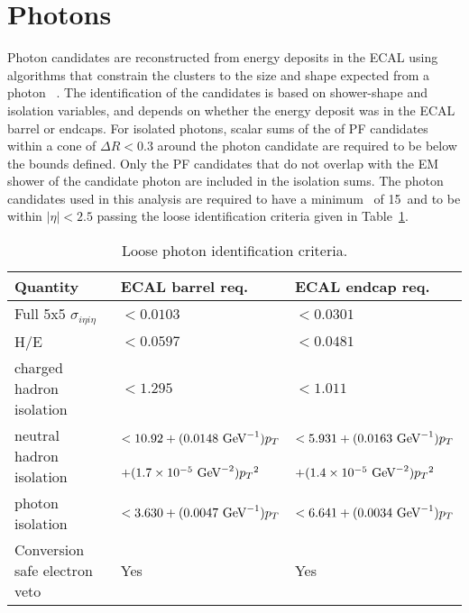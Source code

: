 \section{Photons}
Photon candidates are reconstructed from energy deposits in the ECAL using algorithms
that constrain the clusters to the size and shape expected from a photon~\cite{CMS:EGM-14-001} .
The identification of the candidates is based on shower-shape and isolation variables, and depends on
whether the energy deposit was in the ECAL barrel or endcaps.
For isolated photons, scalar sums of the \pt of PF candidates within a cone of $\Delta R < 0.3$
around the photon candidate are required to be below the bounds defined. Only the PF candidates
that do not overlap with the EM shower of the candidate photon are included in the isolation sums.
The photon candidates used in this analysis are required to have a minimum \pt~of 15~\GeV and to  
be within $|\eta| < 2.5$ passing the loose identification criteria given in Table~\ref{tab:PhotonIDLoose}.

\begin{table}[htbp]
  \begin{center}
 {\footnotesize
  \begin{tabular} {lll}
\hline
Quantity                                   &  ECAL barrel req. & ECAL endcap req.  \\
\hline
Full 5x5 $\sigma_{i\eta i\eta}$            & $< 0.0103$ & $< 0.0301$     \\ \hline 
H/E                                        & $< 0.0597$ & $< 0.0481$     \\ \hline 
charged hadron isolation                   & $< 1.295$  & $< 1.011$      \\ \hline 
\multirow{2}{*}{neutral hadron isolation}  & $< 10.92 + (0.0148\,{\,\text{Ge\hspace{-.08em}V}}^{-1})p_T$          & $< 5.931 + (0.0163\,{\,\text{Ge\hspace{-.08em}V}}^{-1})p_T$        \\  
                                           & $+ (1.7\times 10^{-5}\,{\,\text{Ge\hspace{-.08em}V}}^{-2}){p_T}^2$   & $+(1.4\times 10^{-5}\,{\,\text{Ge\hspace{-.08em}V}}^{-2}){p_T}^2$  \\ \hline
photon isolation                           & $< 3.630 + (0.0047\,{\,\text{Ge\hspace{-.08em}V}}^{-1})p_T$          & $< 6.641 + (0.0034\,{\,\text{Ge\hspace{-.08em}V}}^{-1})p_T$        \\ \hline 
Conversion safe electron veto              & Yes & Yes           \\
\hline
\end{tabular}
}
\caption{Loose photon identification criteria.}
\label{tab:PhotonIDLoose}
  \end{center}
\end{table}


